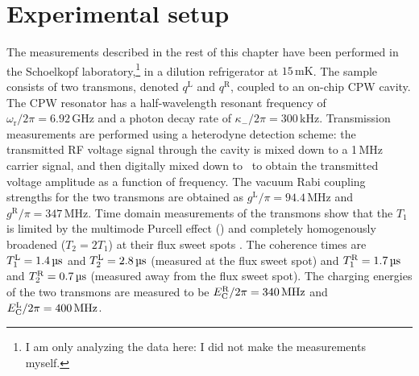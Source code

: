 \section{Experimental setup}
\label{sec:experiment}
The measurements described in the rest of this chapter have been performed in the Schoelkopf laboratory,\footnote{I am only analyzing the data here: I did not make the measurements myself\textellipsis.} in a dilution refrigerator at $15\,\text{mK}$. The sample consists of two transmons, denoted $q^\text{L}$ and $q^\text{R}$,
coupled to an on-chip CPW cavity. The CPW resonator has a half-wavelength resonant frequency of $\omega_\text{r}/2\pi = 6.92\,\text{GHz}$ and a photon decay rate of $\kappa_-/2\pi = 300\,\text{kHz}$. Transmission measurements are performed using a heterodyne detection scheme: the transmitted RF voltage signal through the cavity is mixed down to a 1\,MHz carrier signal, and then digitally mixed down to \dc\ to obtain the transmitted voltage amplitude as a function of frequency.  The vacuum Rabi coupling strengths for the two transmons are obtained as $g^\text{L}/\pi = 94.4\,\text{MHz}$ and $g^\text{R}/\pi =347\,\text{MHz}$. Time domain measurements of the transmons show that the $T_1$ is limited by the multimode Purcell effect () and completely homogenously broadened ($T_2=2T_1$) at their flux sweet spots \cite{houck_controlling_2008}. The coherence times are  $T_1^\text{L} = 1.4\,\text{\textmu s}$ and $T_2^\text{L} = 2.8\,\text{\textmu s}$ (measured at the flux sweet spot) and $T_1^\text{R} = 1.7\,\text{\textmu s}$ and $T_2^\text{R} = 0.7\,\text{\textmu s}$ (measured away from the flux sweet spot). The charging energies of the two transmons are measured to be $E_{\text{C}}^\text{R}/2\pi = 340\,\text{MHz}$ and $E_{\text{C}}^\text{L}/2\pi=400\,\text{MHz}$.


